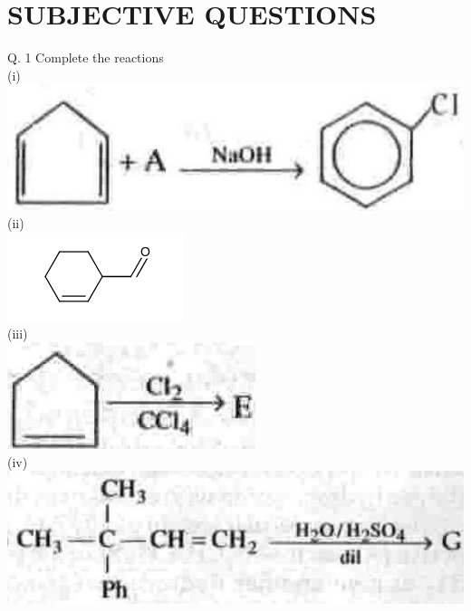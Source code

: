 \documentclass[10pt]{article}
\begin{document}
\section*{SUBJECTIVE QUESTIONS}
Q. 1 Complete the reactions\\
(i)\\
\includegraphics[max width=\textwidth, center]{2025_01_28_8470952b98110cec3aabg-238(4)}\\
(ii)\\
\includegraphics{smile-7f6460845d503f9912f594e12132720c1736f426}\\
(iii)\\
\includegraphics[max width=\textwidth, center]{2025_01_28_8470952b98110cec3aabg-238}\\
(iv)\\
\includegraphics[max width=\textwidth, center]{2025_01_28_8470952b98110cec3aabg-238(3)}\\
\end{document}
